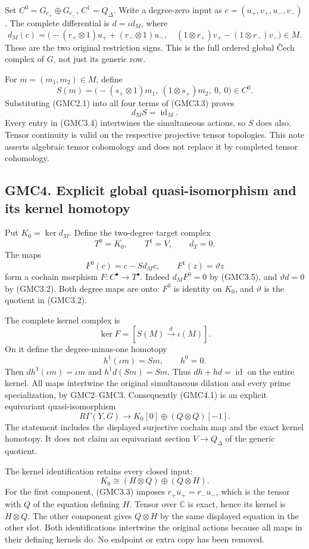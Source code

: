 Set \(C^0=G_{c_+}\oplus G_{c_-}\), \(C^1=Q_\Delta\). Write a degree-zero
input as \(c=(u_+,v_+,u_-,v_-)\). The complete differential is
\(d=\iota d_M\), where \[
d_M(c)=\bigl(
-(r_+\otimes1)u_++(r_-\otimes1)u_-,\quad
(1\otimes r_+)v_+-(1\otimes r_-)v_-
\bigr)\in M.
\tag{GMC3.3}
\] These are the two original restriction signs. This is the full
ordered global Čech complex of \(G\), not just its generic row.

For \(m=(m_1,m_2)\in M\), define \[
S(m)=\bigl(-(s_+\otimes1)m_1,\ (1\otimes s_+)m_2,\ 0,\ 0\bigr)\in C^0.
\tag{GMC3.4}
\] Substituting (GMC2.1) into all four terms of (GMC3.3) proves \[
d_M S=\operatorname{id}_M.
\tag{GMC3.5}
\] Every entry in (GMC3.4) intertwines the simultaneous actions, so
\(S\) does also. Tensor continuity is valid on the respective projective
tensor topologies. This note asserts algebraic tensor cohomology and
does not replace it by completed tensor cohomology.

\subsection{GMC4. Explicit global quasi-isomorphism and its kernel
homotopy}\label{gmc4.-explicit-global-quasi-isomorphism-and-its-kernel-homotopy}

Put \(K_0=\ker d_M\). Define the two-degree target complex \[
T^0=K_0,\qquad T^1=V,\qquad d_T=0.
\] The maps \[
F^0(c)=c-Sd_Mc,\qquad F^1(z)=\vartheta z
\tag{GMC4.1}
\] form a cochain morphism \(F:C^\bullet\to T^\bullet\). Indeed
\(d_MF^0=0\) by (GMC3.5), and \(\vartheta d=0\) by (GMC3.2). Both degree
maps are onto: \(F^0\) is identity on \(K_0\), and \(\vartheta\) is the
quotient in (GMC3.2).

The complete kernel complex is \[
\ker F=[S(M)\xrightarrow{\ d\ }\iota(M)].
\tag{GMC4.2}
\] On it define the degree-minus-one homotopy \[
h^1(\iota m)=Sm,\qquad h^0=0.
\tag{GMC4.3}
\] Then \(dh^1(\iota m)=\iota m\) and \(h^1d(Sm)=Sm\). Thus
\(dh+hd=\operatorname{id}\) on the entire kernel. All maps intertwine
the original simultaneous dilation and every prime specialization, by
GMC2--GMC3. Consequently (GMC4.1) is an explicit equivariant
quasi-isomorphism \[
\boxed{R\Gamma(Y,G)\longrightarrow
K_0[0]\oplus(Q\otimes Q)[-1].}
\tag{GMC4.4}
\] The statement includes the displayed surjective cochain map and the
exact kernel homotopy. It does not claim an equivariant section
\(V\to Q_\Delta\) of the generic quotient.

The kernel identification retains every closed input: \[
K_0\cong(H\otimes Q)\oplus(Q\otimes H).
\tag{GMC4.5}
\] For the first component, (GMC3.3) imposes \(r_+u_+=r_-u_-\), which is
the tensor with \(Q\) of the equation defining \(H\). Tensor over
\(\mathbb C\) is exact, hence its kernel is \(H\otimes Q\). The other
component gives \(Q\otimes H\) by the same displayed equation in the
other slot. Both identifications intertwine the original actions because
all maps in their defining kernels do. No endpoint or extra copy has
been removed.

